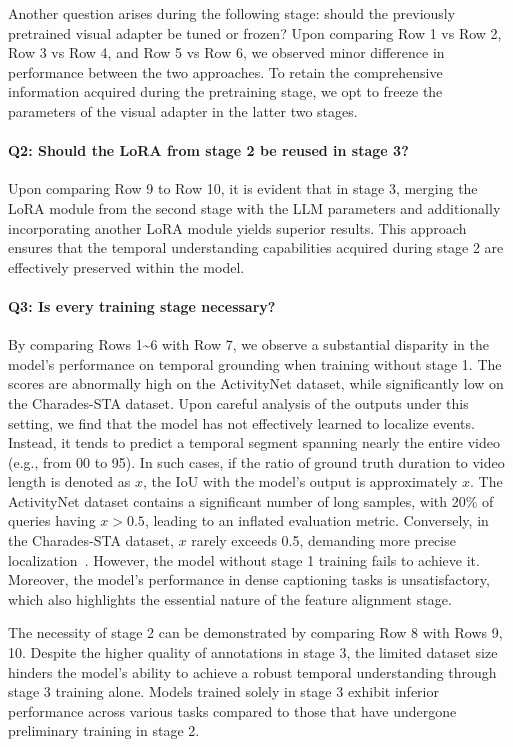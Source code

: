 \documentclass[10pt,twocolumn,letterpaper]{article}
\begin{document}
Another question arises during the following stage: should the previously pretrained visual adapter be tuned or frozen? Upon comparing Row 1 vs Row 2, Row 3 vs Row 4, and Row 5 vs Row 6, we observed minor difference in performance between the two approaches. To retain the comprehensive information acquired during the pretraining stage, we opt to freeze the parameters of the visual adapter in the latter two stages.

\paragraph{Q2: Should the LoRA from stage 2 be reused in stage 3?}  Upon comparing Row 9 to Row 10, it is evident that in stage 3, merging the LoRA module from the second stage with the LLM parameters and additionally incorporating another LoRA module yields superior results. This approach ensures that the temporal understanding capabilities acquired during stage 2 are effectively preserved within the model.
 
\paragraph{Q3: Is every training stage necessary?} By comparing Rows 1\textasciitilde 6 with Row 7, we observe a substantial disparity in the model's performance on temporal grounding when training without stage 1. The scores are abnormally high on the ActivityNet dataset, while significantly low on the Charades-STA dataset. Upon careful analysis of the outputs under this setting, we find that the model has not effectively learned to localize events. Instead, it
tends to predict a temporal segment spanning nearly the entire video (e.g., from 00 to 95). In such cases, if the ratio of ground truth duration to video length is denoted as $x$, the IoU with the model's output is approximately $x$. The ActivityNet dataset contains a significant number of long samples, with 20\% of queries having $x>0.5$, leading to an inflated evaluation metric. Conversely, in the Charades-STA dataset, $x$ rarely exceeds 0.5, demanding more precise localization~\cite{lan2023closer}. However, the model without stage 1 training fails to achieve it. Moreover, the model's performance in dense captioning tasks is unsatisfactory, which also highlights the essential nature of the feature alignment stage.

The necessity of stage 2 can be demonstrated by comparing Row 8 with Rows 9, 10. Despite the higher quality of annotations in stage 3, the limited dataset size hinders the model's ability to achieve a robust temporal understanding through stage 3 training alone. Models trained solely in stage 3 exhibit inferior performance across various tasks compared to those that have undergone preliminary training in stage 2.
\end{document}
